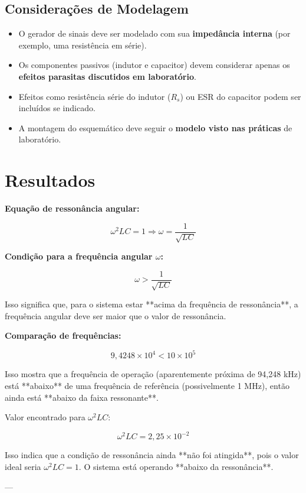 \begin{table}[H]
\subsection*{Considerações de Modelagem}

\begin{itemize}
    \item O gerador de sinais deve ser modelado com sua \textbf{impedância interna} (por exemplo, uma resistência em série).
    \item Os componentes passivos (indutor e capacitor) devem considerar apenas os \textbf{efeitos parasitas discutidos em laboratório}.
    \item Efeitos como resistência série do indutor ($R_s$) ou ESR do capacitor podem ser incluídos se indicado.
    \item A montagem do esquemático deve seguir o \textbf{modelo visto nas práticas} de laboratório.
\end{itemize}


\section{Resultados}
 \textbf{Equação de ressonância angular:}

   $$
   \omega^2 LC = 1 \Rightarrow \omega = \frac{1}{\sqrt{LC}}
   $$

 \textbf{Condição para a frequência angular $\omega$:}

   $$
   \omega > \frac{1}{\sqrt{LC}}
   $$

   Isso significa que, para o sistema estar **acima da frequência de ressonância**, a frequência angular deve ser maior que o valor de ressonância.

\textbf{Comparação de frequências:}

   $$
   9{,}4248 \times 10^4 < 10 \times 10^5
   $$

   Isso mostra que a frequência de operação (aparentemente próxima de 94,248 kHz) está **abaixo** de uma frequência de referência (possivelmente 1 MHz), então ainda está **abaixo da faixa ressonante**.

Valor encontrado para $\omega^2 LC$:

   $$
   \omega^2 LC = 2{,}25 \times 10^{-2}
   $$

   Isso indica que a condição de ressonância ainda **não foi atingida**, pois o valor ideal seria $\omega^2 LC = 1$. O sistema está operando **abaixo da ressonância**.

---


\end{table}
